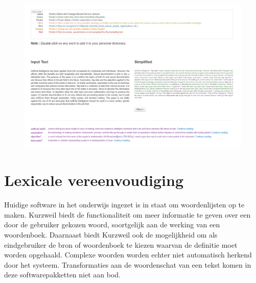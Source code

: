 \begin{figure}[H]
	\includegraphics[width=\linewidth]{img/simplish-output.png}
\end{figure}

\section{Lexicale vereenvoudiging}

Huidige software in het onderwijs ingezet is in staat om woordenlijsten op te maken. Kurzweil biedt de functionaliteit om meer informatie te geven over een door de gebruiker gekozen woord, soortgelijk aan de werking van een woordenboek. Daarnaast biedt Kurzweil ook de mogelijkheid om als eindgebruiker de bron of woordenboek te kiezen waarvan de definitie moet worden opgehaald. Complexe woorden worden echter niet automatisch herkend door het systeem. Transformaties aan de woordenschat van een tekst komen in deze softwarepakketten niet aan bod.

\begin{table}[H]
	\centering
\end{table}

